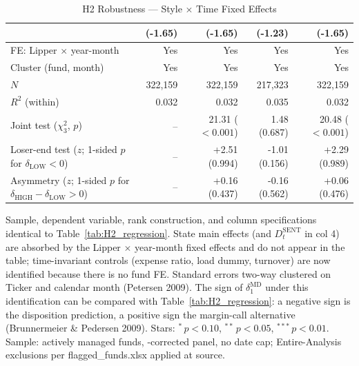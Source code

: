 \begin{table}[!htbp]
{\begin{tabular*}{\linewidth}{@{\extracolsep{\fill}}lrrrr}
 & (-1.65) & (-1.65) & (-1.23) & (-1.65)\\
\midrule
FE: Lipper $\times$ year-month & Yes & Yes & Yes & Yes\\
Cluster (fund, month) & Yes & Yes & Yes & Yes\\
$N$ & 322,159 & 322,159 & 217,323 & 322,159\\
$R^2$ (within) & 0.032 & 0.032 & 0.035 & 0.032\\
Joint test ($\chi^2_3$, $p$) & -- & 21.31 ($<0.001$) & 1.48 (0.687) & 20.48 ($<0.001$)\\
Loser-end test ($z$; 1-sided $p$ for $\delta_{\text{LOW}}<0$) & -- & +2.51 (0.994) & -1.01 (0.156) & +2.29 (0.989)\\
Asymmetry ($z$; 1-sided $p$ for $\delta_{\text{HIGH}}-\delta_{\text{LOW}}>0$) & -- & +0.16 (0.437) & -0.16 (0.562) & +0.06 (0.476)\\
\bottomrule
\end{tabular*}%
}\sbefit
\fi
\setlength{\tabletempwidth}{\wd\tabletempbox}
\ifdim\tabletempwidth>\linewidth\setlength{\tabletempwidth}{\linewidth}\fi
\begin{minipage}{\tabletempwidth}
\captionsetup{width=\linewidth}
\caption{H2 Robustness --- Style $\times$ Time Fixed Effects}\label{tab:H2_robustness}
\ifdim\wd\tabletempbox>\linewidth
  \resizebox{\linewidth}{!}{\usebox{\tabletempbox}}
\else
  \usebox{\tabletempbox}
\fi
\par\medskip
\begin{singlespace}\tablefont\noindent
Sample, dependent variable, rank construction, and column specifications identical to Table~\ref{tab:H2_regression}. State main effects (and $D^{\text{SENT}}_t$ in col 4) are absorbed by the Lipper $\times$ year-month fixed effects and do not appear in the table; time-invariant controls (expense ratio, load dummy, turnover) are now identified because there is no fund FE. Standard errors two-way clustered on Ticker and calendar month (Petersen 2009). The sign of $\delta^{\text{MD}}_1$ under this identification can be compared with Table~\ref{tab:H2_regression}: a negative sign is the disposition prediction, a positive sign the margin-call alternative (Brunnermeier \& Pedersen 2009). Stars: $^{*}\,p<0.10$, $^{**}\,p<0.05$, $^{***}\,p<0.01$. Sample: actively managed funds, \textcite{Evans2010}-corrected panel, no date cap; Entire-Analysis exclusions per flagged\_funds.xlsx applied at source.
\end{singlespace}
\end{minipage}
\end{table}

